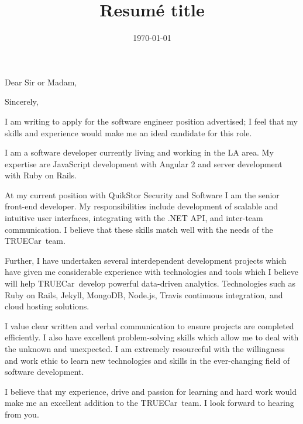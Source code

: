 \documentclass[11pt,a4paper,sans]{moderncv}        %
\title{Resumé title}                               %
\newcommand{\company}{TRUECar}
\begin{document}
\recipient{\company}{}
\date{\today}
\opening{Dear Sir or Madam,}
\closing{Sincerely,}
\makelettertitle

I am writing to apply for the software engineer position advertised; I feel that my skills and experience would make me an ideal candidate for this role.

I am a software developer currently living and working in the LA area.
My expertise are JavaScript development with Angular 2 and server development with Ruby on Rails.

At my current position with QuikStor Security and Software  I am the senior front-end developer. 
My responsibilities include development of scalable and intuitive user interfaces, integrating with the .NET API, and inter-team communication.
I believe that these skills match well with the needs of the \company~team.

Further, I have undertaken several interdependent development projects which have given me considerable experience with technologies and tools which I believe will help \company~develop powerful data-driven analytics. Technologies such as Ruby on Rails, Jekyll, MongoDB, Node.js, Travis continuous integration, and cloud hosting solutions.


I value clear written and verbal communication to ensure projects are completed efficiently. 
I also have excellent problem-solving skills which allow me to deal with the unknown and unexpected. 
I am extremely resourceful with the willingness and work ethic to learn new technologies and skills in the ever-changing field of software development.

I believe that my experience, drive and passion for learning and hard work would make me an excellent addition to the \company~team. 
I look forward to hearing from you.

\makeletterclosing
\end{document}
